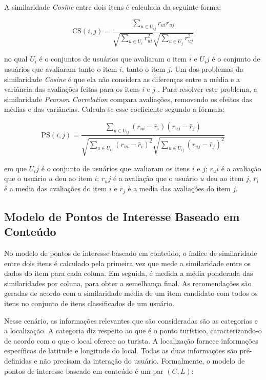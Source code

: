 A similaridade \textit{Cosine} entre dois itens é calculada da seguinte forma:

\begin{equation}
    \mbox{CS}(i,j) = \frac{\sum_{u\in U_{ij}} r_{ui}r_{uj}}
    {\sqrt{\sum_{u\in U_{i}} r_{ui}^2} \sqrt{\sum_{u\in U_{j}} r_{uj}^2}}
\end{equation}

no qual $U_i$ é o conjuntos de usuários que avaliaram o item $i$ e $U_ij$ é o conjunto de usuários que avaliaram tanto o item $i$, tanto o item $j$. Um dos problemas da similaridade \textit{Cosine} é que ela não considera as diferenças entre a média e a variância das avaliações feitas para os itens $i$ e $j$ \citep{Ricci:2010:RSH:1941884}. Para resolver este problema, a similaridade \textit{Pearson Correlation} compara avaliações, removendo os efeitos das médias e das variâncias. Calcula-se esse coeficiente segundo a fórmula:

\begin{equation}
    \mbox{PS}(i,j) = \frac{\sum_{u\in U_{ij}} (r_{ui} - \bar{r}_i)(r_{uj} - \bar{r}_j)}
    {\sqrt{\sum_{u\in U_{ij}} (r_{ui} - \bar{r}_i)^2} \sqrt{\sum_{u\in U_{ij}} (r_{uj} - \bar{r}_j)^2}}
\end{equation}

em que $U_ij$ é o conjunto de usuários que avaliaram os itens $i$ e $j$; $r_ui$ é a avaliação que o usuário $u$ deu ao item $i$; $r_uj$ é a avaliação que o usuário $u$ deu ao item $j$, $\bar{r}_i$ é a media das avaliações do item $i$ e $\bar{r}_j$ é a media das avaliações do item $j$.

\subsection{Modelo de Pontos de Interesse Baseado em Conteúdo}

No modelo de pontos de interesse baseado em conteúdo, o índice de similaridade entre dois itens é calculado pela primeira vez que mede a similaridade entre os dados do item para cada coluna. Em seguida, é medida a média ponderada das similaridades por coluna, para obter a semelhança final. As recomendações são geradas de acordo com a similaridade média de um item candidato com todos os itens no conjunto de itens classificados de um usuário.

Nesse cenário, as informações relevantes que são consideradas são as categorias e a localização. A categoria diz respeito ao que é o ponto turístico, caracterizando-o de acordo com o que o local oferece ao turista. A localização fornece informações específicas de latitude e longitude do local. Todas as duas informações são pré-definidas e não precisam da interação do usuário. Formalmente, o modelo de pontos de interesse baseado em conteúdo é um par $(C,L)$:

